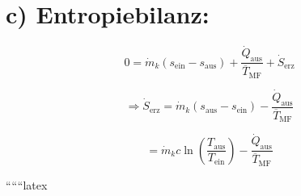 \section*{c) Entropiebilanz:}

\[
0 = \dot{m}_k \left( s_{\text{ein}} - s_{\text{aus}} \right) + \frac{\dot{Q}_{\text{aus}}}{\overline{T}_{\text{MF}}} + \dot{S}_{\text{erz}}
\]

\[
\Rightarrow \dot{S}_{\text{erz}} = \dot{m}_k \left( s_{\text{aus}} - s_{\text{ein}} \right) - \frac{\dot{Q}_{\text{aus}}}{\overline{T}_{\text{MF}}}
\]

\[
= \dot{m}_k c \ln \left( \frac{T_{\text{aus}}}{T_{\text{ein}}} \right) - \frac{\dot{Q}_{\text{aus}}}{\overline{T}_{\text{MF}}}
\]

``````latex
